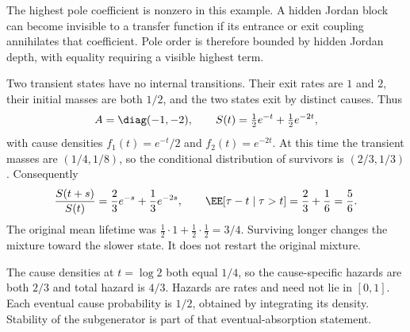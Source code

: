 The highest pole coefficient is nonzero in this example. A hidden Jordan block can become invisible to a transfer function if its entrance or exit coupling annihilates that coefficient. Pole order is therefore bounded by hidden Jordan depth, with equality requiring a visible highest term.

Two transient states have no internal transitions. Their exit rates are $1$ and $2$, their initial masses are both $1/2$, and the two states exit by distinct causes. Thus
\[
A=\diag(-1,-2),\qquad
S(t)=\tfrac12e^{-t}+\tfrac12e^{-2t},
\]
with cause densities $f_1(t)=e^{-t}/2$ and $f_2(t)=e^{-2t}$.
At this time the transient masses are $(1/4,1/8)$, so the conditional distribution of survivors is $(2/3,1/3)$. Consequently
\[
\frac{S(t+s)}{S(t)}=\frac23e^{-s}+\frac13e^{-2s},
\qquad
\EE[\tau-t\mid\tau>t]=\frac23+\frac16=\frac56.
\]
The original mean lifetime was $\tfrac12\cdot1+\tfrac12\cdot\tfrac12=3/4$. Surviving longer changes the mixture toward the slower state. It does not restart the original mixture.

The cause densities at $t=\log2$ both equal $1/4$, so the cause-specific hazards are both $2/3$ and total hazard is $4/3$. Hazards are rates and need not lie in $[0,1]$. Each eventual cause probability is $1/2$, obtained by integrating its density. Stability of the subgenerator is part of that eventual-absorption statement.

